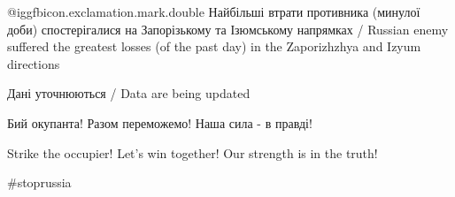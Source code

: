@igg{fbicon.exclamation.mark.double} Найбільші втрати противника (минулої доби)
спостерігалися на Запорізькому та Ізюмському напрямках / Russian enemy suffered
the greatest losses (of the past day) in the  Zaporizhzhya and Izyum directions

Дані уточнюються / Data are being updated

Бий окупанта! Разом переможемо! Наша сила - в правді!

Strike the occupier! Let's win together! Our strength is in the truth!

\#stoprussia
